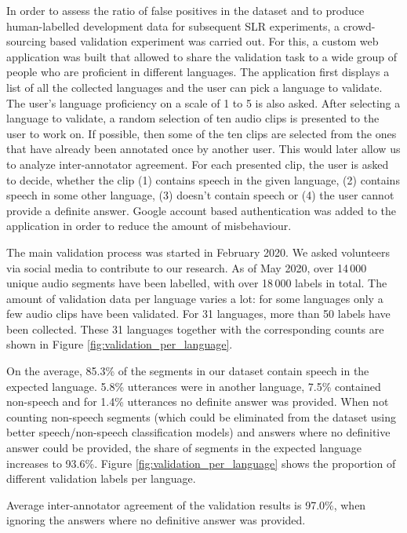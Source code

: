 \documentclass{article}
\begin{document}
In order to assess the ratio of false positives in the dataset and to produce human-labelled
development data for subsequent SLR experiments, a crowd-sourcing based validation experiment was carried out. For this,
a custom web application was built that 
allowed to share the validation task to a wide group of people who are proficient in
different languages. The application first displays  a list of all the collected languages
and the user can pick a language to validate. The user's language proficiency on a scale of 1 to 5 is also asked. After selecting a language to validate, a random selection of ten audio clips is
presented to the user to work on. If possible, then some of the ten clips
are selected from the ones that have already been annotated once by another user. This would later allow us to analyze
inter-annotator agreement. For each presented clip, the user is asked to decide, whether the clip
(1) contains speech in the given language, (2) contains speech in some other language, 
(3) doesn't contain speech or (4) the user cannot provide a definite answer. 
Google account based authentication was added to the application in order to reduce the amount of
misbehaviour. 


The main validation process was started in February 2020. We asked volunteers via social media
to contribute to our research. As of May 2020,  over 14\,000 unique audio segments have been 
labelled, with over 18\,000 labels in total. The amount of validation data per language varies a lot:
for some languages only a few audio clips have been validated. For  31 languages, more than 50 labels have been collected.
These 31 languages together with the corresponding counts are shown in Figure \ref{fig:validation_per_language}.





On the average, 85.3\% of the segments in our dataset contain speech in the expected language.
5.8\% utterances were in another language, 7.5\% contained non-speech and for 1.4\% utterances no definite answer was provided.
When not counting non-speech segments (which could be eliminated from the dataset using better speech/non-speech classification models) and answers where no definitive answer could be provided, the share of segments in the expected language increases to 93.6\%.
Figure \ref{fig:validation_per_language} shows the proportion of different validation labels per language. 


Average inter-annotator agreement of the validation results is 97.0\%, when ignoring the answers where no definitive answer was provided.
\end{document}
